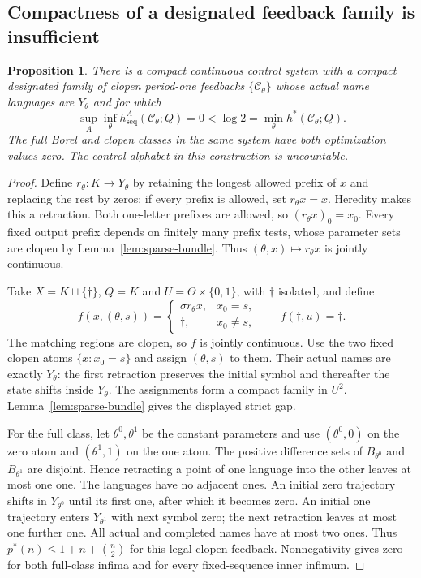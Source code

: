 \documentclass[11pt,reqno]{amsart}
\numberwithin{equation}{section}
\newtheorem{proposition}[theorem]{Proposition}
\theoremstyle{definition}
\newcommand{\C}{\mathcal C}
\newcommand{\hseq}{h_{\mathrm{seq}}}
\newcommand{\hpat}{h^{*}}
\begin{document}
\subsection{Compactness of a designated feedback family is insufficient}

\begin{proposition}\label{prop:compact-family}
There is a compact continuous control system with a compact
designated family of clopen period-one feedbacks $\{\C_\theta\}$
whose actual name languages are $Y_\theta$ and for which
\[
 \sup_A\inf_\theta\hseq^A(\C_\theta;Q)
 =0<\log2=\min_\theta\hpat(\C_\theta;Q).
\]
The full Borel and clopen classes in the same system have both
optimization values zero. The control alphabet in this construction
is uncountable.
\end{proposition}
\begin{proof}
Define $r_\theta:K\to Y_\theta$ by retaining the longest allowed
prefix of $x$ and replacing the rest by zeros; if every prefix
is allowed, set $r_\theta x=x$. Heredity makes this a retraction.
Both one-letter prefixes are allowed, so $(r_\theta x)_0=x_0$.
Every fixed output prefix depends on finitely many prefix tests,
whose parameter sets are clopen by Lemma~\ref{lem:sparse-bundle}.
Thus $(\theta,x)\mapsto r_\theta x$ is jointly continuous.

Take $X=K\sqcup\{\dagger\}$, $Q=K$ and
$U=\Theta\times\{0,1\}$, with $\dagger$ isolated, and define
\[
 f(x,(\theta,s))=
 \begin{cases}\sigma r_\theta x,&x_0=s,\\
 \dagger,&x_0\ne s,\end{cases}
 \qquad f(\dagger,u)=\dagger.
\]
The matching regions are clopen, so $f$ is jointly continuous.
Use the two fixed clopen atoms $\{x:x_0=s\}$ and assign
$(\theta,s)$ to them. Their actual names are exactly $Y_\theta$:
the first retraction preserves the initial symbol and thereafter
the state shifts inside $Y_\theta$. The assignments form a
compact family in $U^2$. Lemma~\ref{lem:sparse-bundle} gives the
displayed strict gap.

For the full class, let $\theta^0,\theta^1$ be the constant
parameters and use $(\theta^0,0)$ on the zero atom and
$(\theta^1,1)$ on the one atom. The positive difference sets of
$B_{\theta^0}$ and $B_{\theta^1}$ are disjoint. Hence retracting
a point of one language into the other leaves at most one one.
The languages have no adjacent ones. An initial zero trajectory
shifts in $Y_{\theta^0}$ until its first one, after which it
becomes zero. An initial one trajectory enters $Y_{\theta^1}$
with next symbol zero; the next retraction leaves at most one
further one. All actual and completed names have at most two ones.
Thus $p^*(n)\le1+n+\binom n2$ for this legal clopen feedback.
Nonnegativity gives zero for both full-class infima and for
every fixed-sequence inner infimum.
\end{proof}
\end{document}
